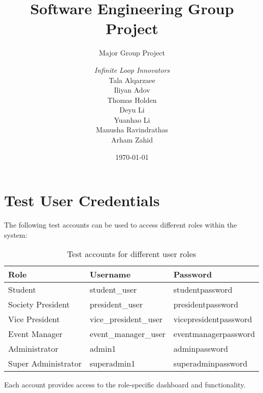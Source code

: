 \documentclass[a4paper, 12pt]{report}
\title{Software Engineering Group Project}
\subtitle{Major Group Project}%
\author{\textit{Infinite Loop Innovators}\\  %
    Tala Alqarzaee\\                        %
    Iliyan Adov\\                        %
    Thomas Holden\\                       %
    Deyu Li\\                      %
    Yuanhao Li\\                        %
    Manusha Ravindrathas\\                      %
    Arham Zahid\\                       %
}
\date{\today}
\begin{document}
    \maketitle
    \romantableofcontents

    
    
    
    
    
    

    \appendix
    \chapter{Test User Credentials}
    \label{app:credentials}
    
    The following test accounts can be used to access different roles within the system:
    
    \begin{table}[h]
    \centering
    \begin{tabular}{|l|l|l|}
    \hline
    \textbf{Role} & \textbf{Username} & \textbf{Password} \\
    \hline
    Student & student\_user & studentpassword \\
    \hline
    Society President & president\_user & presidentpassword \\
    \hline
    Vice President & vice\_president\_user & vicepresidentpassword \\
    \hline
    Event Manager & event\_manager\_user & eventmanagerpassword \\
    \hline
    Administrator & admin1 & adminpassword \\
    \hline
    Super Administrator & superadmin1 & superadminpassword \\
    \hline
    \end{tabular}
    \caption{Test accounts for different user roles}
    \label{tab:test-accounts}
    \end{table}
    
    Each account provides access to the role-specific dashboard and functionality.
\end{document}

